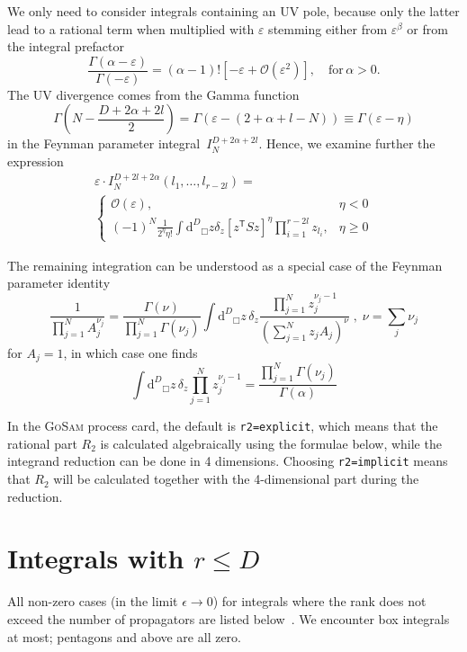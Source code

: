 \documentclass[11pt,a4paper]{refrep}
\newcommand{\gosam}{\textsc{GoSam}\xspace}
\newcommand{\diff}[1][{}]{{\mathrm{d}}^{#1}\!}
\begin{document}
We only need to consider integrals containing an UV pole, because only the latter lead to
a rational term when multiplied with $\varepsilon$ stemming either from
$\varepsilon^\beta$ or from the integral prefactor
\begin{equation}
\frac{\Gamma(\alpha-\varepsilon)}{\Gamma(-\varepsilon)}=
(\alpha-1)!\left[-\varepsilon +{\mathcal O}(\varepsilon^2)\right],
\quad\text{for}\,\alpha>0.
\end{equation}
The UV divergence comes from the Gamma function
\begin{equation}
\Gamma\left(N-\frac{D+2\alpha+2l}2\right)=
\Gamma(\varepsilon-(2+\alpha+l-N))\equiv\Gamma(\varepsilon-\eta)
\end{equation}
in the Feynman parameter integral~$I_N^{D+2\alpha+2l}$.
Hence, we examine further the expression
\begin{multline}
\varepsilon\cdot I_N^{D+2l+2\alpha}(l_1,\ldots, l_{r-2l})=\\
\left\{\begin{array}{lr}
{\mathcal O}(\varepsilon),&\eta<0\\
(-1)^N\frac1{2^\eta\eta!}\int\diff[D]_\Box\!z\delta_z
\left[z^{\mathsf{T}}Sz\right]^\eta
\prod_{i=1}^{r-2l}z_{l_i},&\eta\geq0
\end{array}\right.
\end{multline}

The remaining integration can be understood as a special case of the
Feynman parameter identity
\begin{equation}
\frac{1}{\prod_{j=1}^N A_j^{\nu_j}}=\frac{\Gamma(\nu)}{
\prod_{j=1}^N \Gamma(\nu_j)}\int\!\diff[D]_\Box\!z\,\delta_z
\frac{\prod_{j=1}^N z_j^{\nu_j-1}}{\left(
\sum_{j=1}^N z_j A_j\right)^\nu}\; , \; \nu=\sum_j \nu_j
\end{equation}
for $A_j=1$, in which case one finds
\begin{equation}
\int\!\diff[D]_\Box\!z\,\delta_z
\prod_{j=1}^N z_j^{\nu_j-1}=\frac{\prod_{j=1}^N \Gamma(\nu_j)}%
{\Gamma(\alpha)}
\end{equation}

In the \gosam{} process card, the default is {\tt r2=explicit}, which means that
the rational part $R_2$ is calculated algebraically using the formulae below,
while the integrand reduction can be done in 4 dimensions.
Choosing {\tt r2=implicit} means that $R_2$ will be calculated together with the 4-dimensional
part during the reduction.

\section*{Integrals with \boldmath$r\leq D$}
All non-zero cases (in the limit $\epsilon\to0$) for
integrals where the rank does not exceed the number of propagators are listed
 below~\cite{Binoth:2006hk,Reiter:2009kb}. We encounter box integrals at most; pentagons and above are all zero.
\end{document}

